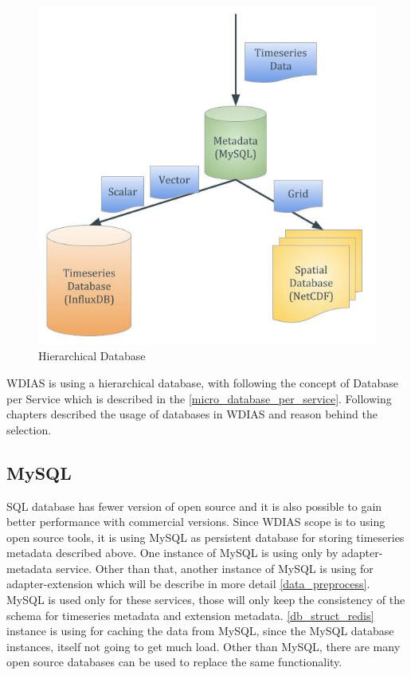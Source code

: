 \begin{figure}[htp]
    \centering
    \includegraphics[width=1\textwidth]{method/microservice/hierarchical_database.jpg}
    \caption{Hierarchical Database}
    \label{fi:hierarchical_database}
\end{figure}

WDIAS is using a hierarchical database, with following the concept of Database per Service which is described in the \ref{micro_database_per_service}.
Following chapters described the usage of databases in WDIAS and reason behind the selection.

\subsection{MySQL}
\label{sub:mysql}


SQL database has fewer version of open source and it is also possible to gain better performance with commercial versions. 
Since WDIAS scope is to using open source tools, it is using MySQL as persistent database for storing timeseries metadata described above.
One instance of MySQL is using only by adapter-metadata service.
Other than that, another instance of MySQL is using for adapter-extension which will be describe in more detail \ref{data_preprocess}.
MySQL is used only for these services, those will only keep the consistency of the schema for timeseries metadata and extension metadata.
\ref{db_struct_redis} instance is using for caching the data from MySQL, since the MySQL database instances, itself not going to get much load.
Other than MySQL, there are many open source databases can be used to replace the same functionality.

